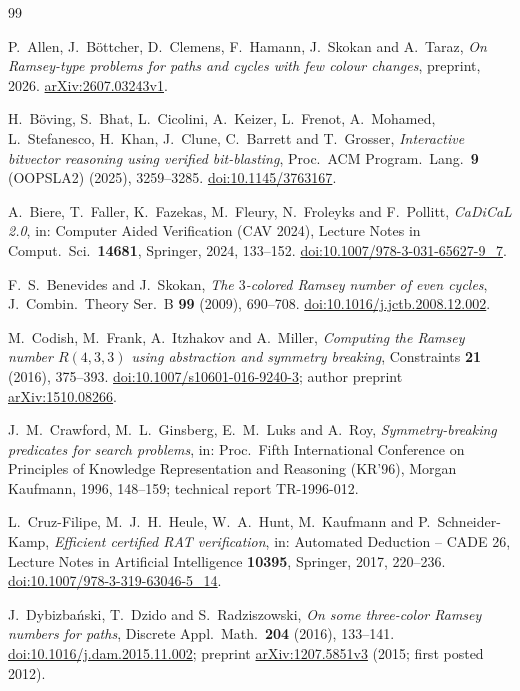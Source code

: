\documentclass[11pt]{article}
\theoremstyle{definition}
\theoremstyle{remark}
\begin{document}
\begin{thebibliography}{99}

P.~Allen, J.~Böttcher, D.~Clemens, F.~Hamann, J.~Skokan and A.~Taraz,
\emph{On Ramsey-type problems for paths and cycles with few colour changes}, preprint, 2026.
\href{https://arxiv.org/abs/2607.03243v1}{arXiv:2607.03243v1}.

H.~Böving, S.~Bhat, L.~Cicolini, A.~Keizer, L.~Frenot, A.~Mohamed,
L.~Stefanesco, H.~Khan, J.~Clune, C.~Barrett and T.~Grosser,
\emph{Interactive bitvector reasoning using verified bit-blasting},
Proc.\ ACM Program.\ Lang.\ \textbf{9} (OOPSLA2) (2025), 3259--3285.
\href{https://doi.org/10.1145/3763167}{doi:10.1145/3763167}.

A.~Biere, T.~Faller, K.~Fazekas, M.~Fleury, N.~Froleyks and F.~Pollitt,
\emph{CaDiCaL 2.0}, in: Computer Aided Verification (CAV 2024), Lecture
Notes in Comput.\ Sci.\ \textbf{14681}, Springer, 2024, 133--152.
\href{https://doi.org/10.1007/978-3-031-65627-9_7}{doi:10.1007/978-3-031-65627-9\_7}.

F.~S.~Benevides and J.~Skokan, \emph{The $3$-colored Ramsey number of even
cycles}, J.~Combin.\ Theory Ser.~B \textbf{99} (2009), 690--708.
\href{https://doi.org/10.1016/j.jctb.2008.12.002}{doi:10.1016/j.jctb.2008.12.002}.

M.~Codish, M.~Frank, A.~Itzhakov and A.~Miller,
\emph{Computing the Ramsey number $R(4,3,3)$ using abstraction and
symmetry breaking}, Constraints \textbf{21} (2016), 375--393.
\href{https://doi.org/10.1007/s10601-016-9240-3}{doi:10.1007/s10601-016-9240-3};
author preprint \href{https://arxiv.org/abs/1510.08266}{arXiv:1510.08266}.

J.~M.~Crawford, M.~L.~Ginsberg, E.~M.~Luks and A.~Roy,
\emph{Symmetry-breaking predicates for search problems}, in: Proc.\ Fifth
International Conference on Principles of Knowledge Representation and
Reasoning (KR'96), Morgan Kaufmann, 1996, 148--159; technical report TR-1996-012.

L.~Cruz-Filipe, M.~J.~H.~Heule, W.~A.~Hunt, M.~Kaufmann and
P.~Schneider-Kamp, \emph{Efficient certified RAT verification}, in:
Automated Deduction -- CADE 26, Lecture Notes in Artificial Intelligence
\textbf{10395}, Springer, 2017, 220--236.
\href{https://doi.org/10.1007/978-3-319-63046-5_14}{doi:10.1007/978-3-319-63046-5\_14}.

J.~Dybizbański, T.~Dzido and S.~Radziszowski,
\emph{On some three-color Ramsey numbers for paths}, Discrete Appl.\
Math.\ \textbf{204} (2016), 133--141.
\href{https://doi.org/10.1016/j.dam.2015.11.002}{doi:10.1016/j.dam.2015.11.002};
preprint \href{https://arxiv.org/abs/1207.5851v3}{arXiv:1207.5851v3} (2015; first posted 2012).


\end{thebibliography}
\end{document}
